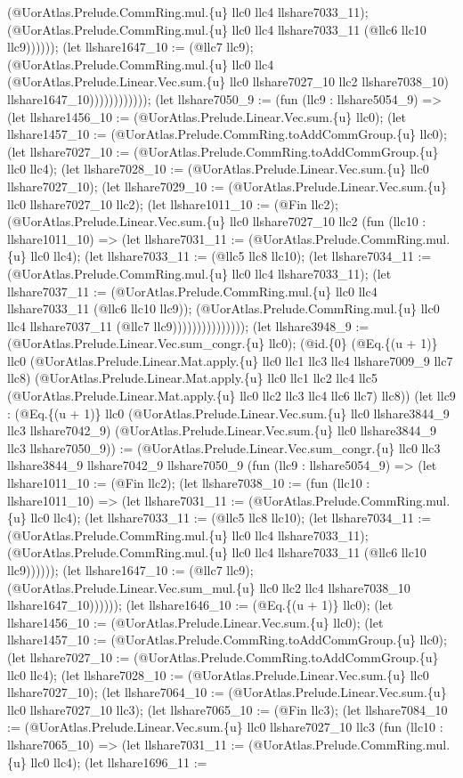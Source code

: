 \documentclass[11pt]{article}
\begin{document}
(@UorAtlas.Prelude.CommRing.mul.\{u\} llc0 llc4 llshare7033\_11); (@UorAtlas.Prelude.CommRing.mul.\{u\} llc0 llc4 llshare7033\_11 (@llc6 llc10 llc9)))))); (let llshare1647\_10 := (@llc7 llc9); (@UorAtlas.Prelude.CommRing.mul.\{u\} llc0 llc4 (@UorAtlas.Prelude.Linear.Vec.sum.\{u\} llc0 llshare7027\_10 llc2 llshare7038\_10) llshare1647\_10)))))))))))); (let llshare7050\_9 := (fun (llc9 : llshare5054\_9) => (let llshare1456\_10 := (@UorAtlas.Prelude.Linear.Vec.sum.\{u\} llc0); (let llshare1457\_10 := (@UorAtlas.Prelude.CommRing.toAddCommGroup.\{u\} llc0); (let llshare7027\_10 := (@UorAtlas.Prelude.CommRing.toAddCommGroup.\{u\} llc0 llc4); (let llshare7028\_10 := (@UorAtlas.Prelude.Linear.Vec.sum.\{u\} llc0 llshare7027\_10); (let llshare7029\_10 := (@UorAtlas.Prelude.Linear.Vec.sum.\{u\} llc0 llshare7027\_10 llc2); (let llshare1011\_10 := (@Fin llc2); (@UorAtlas.Prelude.Linear.Vec.sum.\{u\} llc0 llshare7027\_10 llc2 (fun (llc10 : llshare1011\_10) => (let llshare7031\_11 := (@UorAtlas.Prelude.CommRing.mul.\{u\} llc0 llc4); (let llshare7033\_11 := (@llc5 llc8 llc10); (let llshare7034\_11 := (@UorAtlas.Prelude.CommRing.mul.\{u\} llc0 llc4 llshare7033\_11); (let llshare7037\_11 := (@UorAtlas.Prelude.CommRing.mul.\{u\} llc0 llc4 llshare7033\_11 (@llc6 llc10 llc9)); (@UorAtlas.Prelude.CommRing.mul.\{u\} llc0 llc4 llshare7037\_11 (@llc7 llc9))))))))))))))); (let llshare3948\_9 := (@UorAtlas.Prelude.Linear.Vec.sum\_congr.\{u\} llc0); (@id.\{0\} (@Eq.\{(u + 1)\} llc0 (@UorAtlas.Prelude.Linear.Mat.apply.\{u\} llc0 llc1 llc3 llc4 llshare7009\_9 llc7 llc8) (@UorAtlas.Prelude.Linear.Mat.apply.\{u\} llc0 llc1 llc2 llc4 llc5 (@UorAtlas.Prelude.Linear.Mat.apply.\{u\} llc0 llc2 llc3 llc4 llc6 llc7) llc8)) (let llc9 : (@Eq.\{(u + 1)\} llc0 (@UorAtlas.Prelude.Linear.Vec.sum.\{u\} llc0 llshare3844\_9 llc3 llshare7042\_9) (@UorAtlas.Prelude.Linear.Vec.sum.\{u\} llc0 llshare3844\_9 llc3 llshare7050\_9)) := (@UorAtlas.Prelude.Linear.Vec.sum\_congr.\{u\} llc0 llc3 llshare3844\_9 llshare7042\_9 llshare7050\_9 (fun (llc9 : llshare5054\_9) => (let llshare1011\_10 := (@Fin llc2); (let llshare7038\_10 := (fun (llc10 : llshare1011\_10) => (let llshare7031\_11 := (@UorAtlas.Prelude.CommRing.mul.\{u\} llc0 llc4); (let llshare7033\_11 := (@llc5 llc8 llc10); (let llshare7034\_11 := (@UorAtlas.Prelude.CommRing.mul.\{u\} llc0 llc4 llshare7033\_11); (@UorAtlas.Prelude.CommRing.mul.\{u\} llc0 llc4 llshare7033\_11 (@llc6 llc10 llc9)))))); (let llshare1647\_10 := (@llc7 llc9); (@UorAtlas.Prelude.Linear.Vec.sum\_mul.\{u\} llc0 llc2 llc4 llshare7038\_10 llshare1647\_10)))))); (let llshare1646\_10 := (@Eq.\{(u + 1)\} llc0); (let llshare1456\_10 := (@UorAtlas.Prelude.Linear.Vec.sum.\{u\} llc0); (let llshare1457\_10 := (@UorAtlas.Prelude.CommRing.toAddCommGroup.\{u\} llc0); (let llshare7027\_10 := (@UorAtlas.Prelude.CommRing.toAddCommGroup.\{u\} llc0 llc4); (let llshare7028\_10 := (@UorAtlas.Prelude.Linear.Vec.sum.\{u\} llc0 llshare7027\_10); (let llshare7064\_10 := (@UorAtlas.Prelude.Linear.Vec.sum.\{u\} llc0 llshare7027\_10 llc3); (let llshare7065\_10 := (@Fin llc3); (let llshare7084\_10 := (@UorAtlas.Prelude.Linear.Vec.sum.\{u\} llc0 llshare7027\_10 llc3 (fun (llc10 : llshare7065\_10) => (let llshare7031\_11 := (@UorAtlas.Prelude.CommRing.mul.\{u\} llc0 llc4); (let llshare1696\_11 := 
\end{document}
